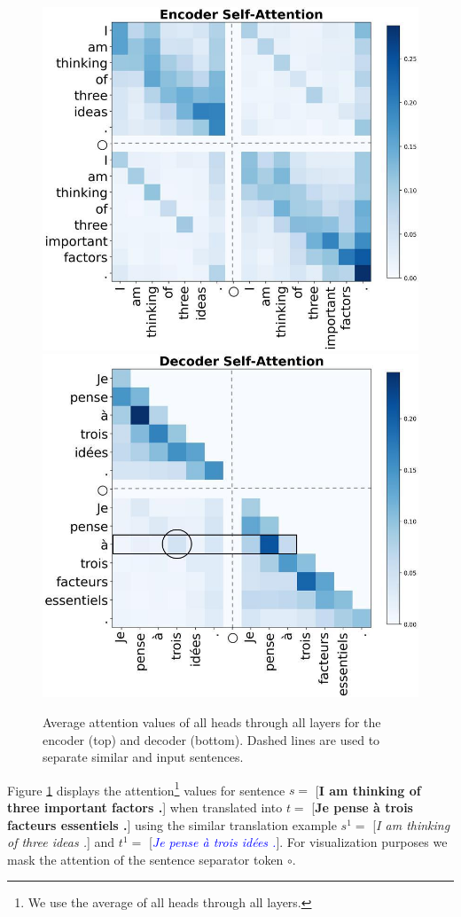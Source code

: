 \begin{figure}[h!]
    \includegraphics[width=.92\linewidth]{graphics/attention_enc.png}
    \includegraphics[width=.92\linewidth]{graphics/attention_dec.png}
\caption{Average attention values of all heads through all layers for the encoder (top) and decoder (bottom). Dashed lines are used to separate similar and input sentences.}
\label{fig:attn}
\end{figure}

Figure \ref{fig:attn} displays the attention\footnote{We use the average of all heads through all layers.} values for sentence $s=$ [{\bf I am thinking of three important factors .}] when translated into $t=$ [{\bf Je pense à trois facteurs essentiels .}] using the similar translation example $s^1=$ [{\it I am thinking of three ideas .}] and $t^1=$ [\textcolor{blue}{{\it Je pense à trois idées .}}]. For visualization purposes we mask the attention of the sentence separator token $\circ$.

